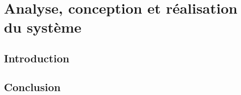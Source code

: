 \chapter{Analyse, conception et réalisation du système}
	\section*{Introduction}
		\lipsum[2]

\section*{Conclusion}
